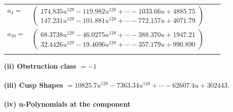\documentclass[1p]{elsarticle_modified}
\theoremstyle{definition}
\begin{document}
\begin{tabular}{m{7pt} m{180pt} m{7pt} m{180pt} }
\flushright $a_{4}=$&$\begin{pmatrix}174.835 u^{129}-119.982 u^{128}+\cdots-1033.66 u+4885.75\\147.231 u^{129}-101.881 u^{128}+\cdots-772.157 u+4071.79\end{pmatrix}$ \\
\flushright $a_{10}=$&$\begin{pmatrix}68.3738 u^{129}-46.0275 u^{128}+\cdots-388.370 u+1947.21\\32.4426 u^{129}-19.4696 u^{128}+\cdots-357.179 u+990.890\end{pmatrix}$\\&\end{tabular}
\flushleft \textbf{(ii) Obstruction class $= -1$}\\~\\
\flushleft \textbf{(iii) Cusp Shapes $= 10825.7 u^{129}-7363.34 u^{128}+\cdots-62607.4 u+302443.$}\\~\\
\newpage\renewcommand{\arraystretch}{1}
\flushleft \textbf{(iv) u-Polynomials at the component}\newline \\
\end{document}
